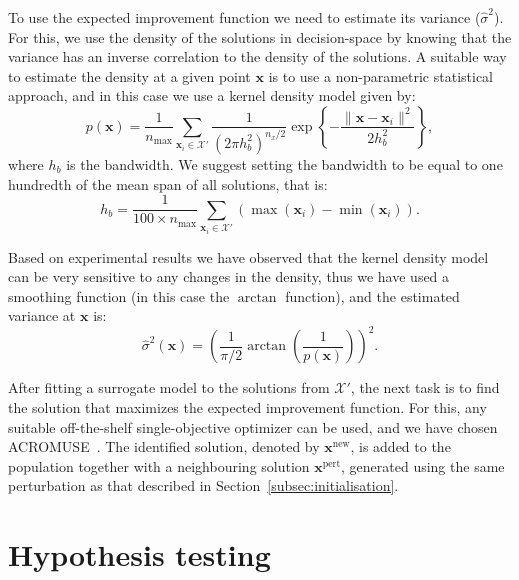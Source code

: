 \documentclass{llncs}
\newcommand{\vx}{\mathbf{x}} %
\newcommand{\XSet}{\mathcal{X}} %
\begin{document}
To use the expected improvement function we need to estimate its variance ($\hat{\sigma}^2$). For this, we use the density of the solutions in decision-space by knowing that the variance has an inverse correlation to the density of the solutions. A suitable way to estimate the density at a given point $\vx$ is to use a non-parametric statistical approach, and in this case we use a kernel density model given by:
\begin{equation}
 p(\vx) = \frac{1}{n_{\text{max}}} \sum_{\vx_i \in \XSet'} \frac{1}{(2\pi h_b^2)^{n_x/2}}   \exp\left\{-\frac{\| \vx-\vx_i \|^2}{2h_b^2}\right\},
\end{equation}
where $h_b$ is the bandwidth. We suggest setting the bandwidth to be equal to one hundredth of the mean span of all solutions, that is:
\begin{equation}
 h_b = \frac{1}{100\times n_{\text{max}}} \sum_{\vx_i \in \XSet'} (\max(\vx_i) - \min(\vx_i)).
\end{equation}

Based on experimental results we have observed that the kernel density model can be very sensitive to any changes in the density, thus we have used a smoothing function (in this case the $\arctan$ function), and the estimated variance at $\vx$ is:
\begin{equation}
 \hat{\sigma}^2(\vx) = \left( \frac{1}{\pi/2} \arctan \left(\frac{1}{p(\vx)}\right) \right)^2.
\end{equation}

After fitting a surrogate model to the solutions from $\XSet'$, the next task is to find the solution that maximizes the expected improvement function. For this, any suitable off-the-shelf single-objective optimizer can be used, and we have chosen ACROMUSE~\cite{Ginley2011}. The identified solution, denoted by $\vx^\text{new}$, is added to the population together with a neighbouring solution $\vx^\text{pert}$, generated using the same perturbation as that described in Section~\ref{subsec:initialisation}.

\section{Hypothesis testing}\label{sec:test_suite}

\end{document}
